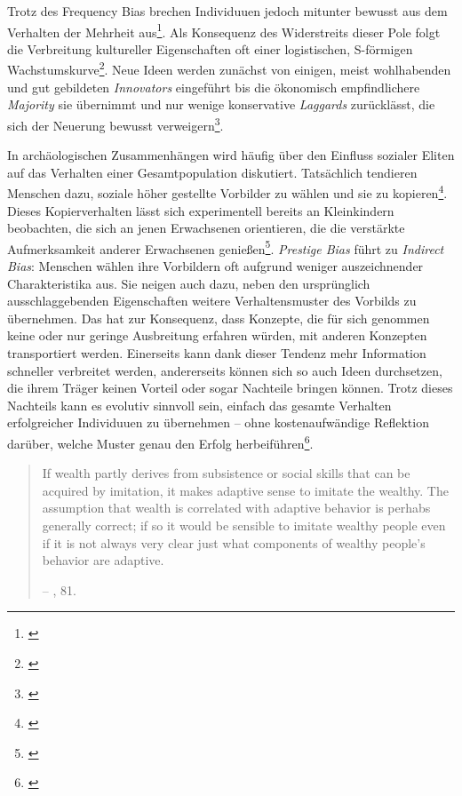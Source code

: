 \documentclass[openany,twoside,twocolumn]{book}
\let\rmarkdownfootnote\footnote%
\def\footnote{\protect\rmarkdownfootnote}
\begin{document}
Trotz des Frequency Bias brechen Individuuen jedoch mitunter bewusst aus
dem Verhalten der Mehrheit aus\footnote{\textcite{henrich_evolution_2003}}.
Als Konsequenz des Widerstreits dieser Pole folgt die Verbreitung
kultureller Eigenschaften oft einer logistischen, S-förmigen
Wachstumskurve\footnote{\textcite{henrich_cultural_2001}}. Neue Ideen
werden zunächst von einigen, meist wohlhabenden und gut gebildeten
\emph{Innovators} eingeführt bis die ökonomisch empfindlichere
\emph{Majority} sie übernimmt und nur wenige konservative
\emph{Laggards} zurücklässt, die sich der Neuerung bewusst
verweigern\footnote{\textcite{rogers_diffusion_1983}}.

In archäologischen Zusammenhängen wird häufig über den Einfluss sozialer
Eliten auf das Verhalten einer Gesamtpopulation diskutiert. Tatsächlich
tendieren Menschen dazu, soziale höher gestellte Vorbilder zu wählen und
sie zu kopieren\footnote{\textcite{henrich_evolution_2001}}. Dieses
Kopierverhalten lässt sich experimentell bereits an Kleinkindern
beobachten, die sich an jenen Erwachsenen orientieren, die die
verstärkte Aufmerksamkeit anderer Erwachsenen genießen\footnote{\textcite{chudek_prestige-biased_2012}}.
\emph{Prestige Bias} führt zu \emph{Indirect Bias}: Menschen wählen ihre
Vorbildern oft aufgrund weniger auszeichnender Charakteristika aus. Sie
neigen auch dazu, neben den ursprünglich ausschlaggebenden Eigenschaften
weitere Verhaltensmuster des Vorbilds zu übernehmen. Das hat zur
Konsequenz, dass Konzepte, die für sich genommen keine oder nur geringe
Ausbreitung erfahren würden, mit anderen Konzepten transportiert werden.
Einerseits kann dank dieser Tendenz mehr Information schneller
verbreitet werden, andererseits können sich so auch Ideen durchsetzen,
die ihrem Träger keinen Vorteil oder sogar Nachteile bringen können.
Trotz dieses Nachteils kann es evolutiv sinnvoll sein, einfach das
gesamte Verhalten erfolgreicher Individuuen zu übernehmen -- ohne
kostenaufwändige Reflektion darüber, welche Muster genau den Erfolg
herbeiführen\footnote{\textcite{smith_cultural_1992}}.

\begin{quote}
If wealth partly derives from subsistence or social skills that can be
acquired by imitation, it makes adaptive sense to imitate the wealthy.
The assumption that wealth is correlated with adaptive behavior is
perhabs generally correct; if so it would be sensible to imitate wealthy
people even if it is not always very clear just what components of
wealthy people's behavior are adaptive.

-- \textcite{smith_cultural_1992}, 81.
\end{quote}
\end{document}
